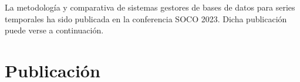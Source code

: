 
La metodología y comparativa de sistemas gestores de bases de datos para series temporales 
ha sido publicada en la conferencia SOCO 2023. Dicha publicación puede verse a continuación.

\section{Publicación}

